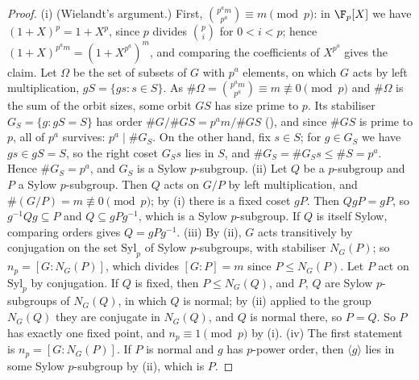 \begin{proof}
(i) (Wielandt's argument.) First, $\binom{p^am}{p^a}\equiv m\pmod p$: in $\F_p[X]$ we have $(1+X)^p=1+X^p$, since $p$ divides $\binom pi$ for
$0<i<p$; hence $(1+X)^{p^am}=(1+X^{p^a})^m$, and comparing the coefficients of $X^{p^a}$ gives the claim. Let $\Omega$ be the set of subsets of $G$ with
$p^a$ elements, on which $G$ acts by left multiplication, $gS=\{gs:s\in S\}$. As $\#\Omega=\binom{p^am}{p^a}\equiv m\not\equiv0\pmod p$ and $\#\Omega$ is the
sum of the orbit sizes, some orbit $GS$ has size prime to $p$. Its stabiliser $G_S=\{g:gS=S\}$ has order $\#G/\#GS=p^am/\#GS$ (), and
since $\#GS$ is prime to $p$, all of $p^a$ survives: $p^a\mid\#G_S$. On the other hand, fix $s\in S$; for $g\in G_S$ we have $gs\in gS=S$, so the right coset
$G_Ss$ lies in $S$, and $\#G_S=\#G_Ss\le\#S=p^a$. Hence $\#G_S=p^a$, and $G_S$ is a Sylow $p$-subgroup. (ii) Let $Q$ be a $p$-subgroup and $P$ a Sylow $p$-subgroup. Then $Q$ acts on $G/P$ by left multiplication, and $\#(G/P)=m\not\equiv0
\pmod p$; by (i) there is a fixed coset $gP$. Then $QgP=gP$, so $g^{-1}Qg\subseteq P$ and $Q\subseteq gPg^{-1}$, which is a Sylow
$p$-subgroup. If $Q$ is itself Sylow, comparing orders gives $Q=gPg^{-1}$. (iii) By (ii), $G$ acts transitively by conjugation on the set $\mathrm{Syl}_p$ of
Sylow $p$-subgroups, with stabiliser $N_G(P)$; so $n_p=[G:N_G(P)]$, which divides $[G:P]=m$ since $P\le N_G(P)$. Let $P$ act on $\mathrm{Syl}_p$ by
conjugation. If $Q$ is fixed, then $P\le N_G(Q)$, and $P$, $Q$ are Sylow $p$-subgroups of $N_G(Q)$, in which $Q$ is normal; by (ii) applied to the group $N_G(Q)$ they are
conjugate in $N_G(Q)$, and $Q$ is normal there, so $P=Q$. So $P$ has exactly one fixed point, and $n_p\equiv1\pmod p$ by (i). (iv) The first statement is
$n_p=[G:N_G(P)]$. If $P$ is normal and $g$ has $p$-power order, then $\langle g\rangle$ lies in some Sylow $p$-subgroup by (ii), which is $P$.
\end{proof}

